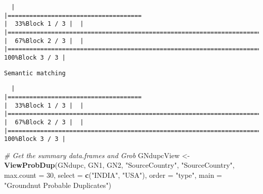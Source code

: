 \documentclass[
]{article}
\newenvironment{Shaded}{\begin{snugshade}}{\end{snugshade}}
\newcommand{\CommentTok}[1]{\textcolor[rgb]{0.56,0.35,0.01}{\textit{#1}}}
\newcommand{\DataTypeTok}[1]{\textcolor[rgb]{0.13,0.29,0.53}{#1}}
\newcommand{\DecValTok}[1]{\textcolor[rgb]{0.00,0.00,0.81}{#1}}
\newcommand{\KeywordTok}[1]{\textcolor[rgb]{0.13,0.29,0.53}{\textbf{#1}}}
\newcommand{\NormalTok}[1]{#1}
\newcommand{\StringTok}[1]{\textcolor[rgb]{0.31,0.60,0.02}{#1}}
\begin{document}
\begin{verbatim}
  |                                                                                                                       |=====================================                                                                          |  33%Block 1 / 3 |  |                                                                                                                       |==========================================================================                                     |  67%Block 2 / 3 |  |                                                                                                                       |===============================================================================================================| 100%Block 3 / 3 |
\end{verbatim}

\begin{verbatim}
Semantic matching
\end{verbatim}

\begin{verbatim}
  |                                                                                                                       |=====================================                                                                          |  33%Block 1 / 3 |  |                                                                                                                       |==========================================================================                                     |  67%Block 2 / 3 |  |                                                                                                                       |===============================================================================================================| 100%Block 3 / 3 |
\end{verbatim}

\begin{Shaded}
\begin{Highlighting}[]
\CommentTok{# Get the summary data.frames and Grob}
\NormalTok{GNdupcView <-}\StringTok{ }\KeywordTok{ViewProbDup}\NormalTok{(GNdupc, GN1, GN2, }\StringTok{"SourceCountry"}\NormalTok{, }\StringTok{"SourceCountry"}\NormalTok{,}
                         \DataTypeTok{max.count =} \DecValTok{30}\NormalTok{, }\DataTypeTok{select =} \KeywordTok{c}\NormalTok{(}\StringTok{"INDIA"}\NormalTok{, }\StringTok{"USA"}\NormalTok{), }\DataTypeTok{order =} \StringTok{"type"}\NormalTok{,}
                         \DataTypeTok{main =} \StringTok{"Groundnut Probable Duplicates"}\NormalTok{)}
\end{Highlighting}
\end{Shaded}
\end{document}

